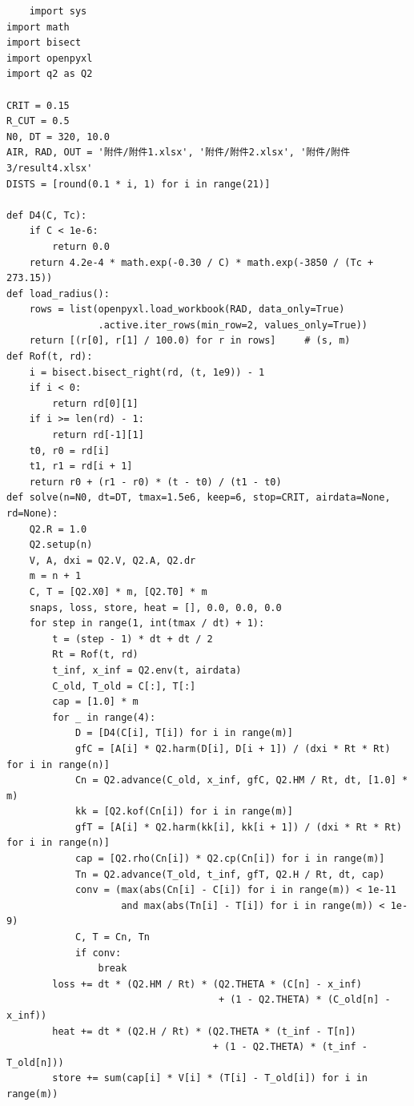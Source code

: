 \documentclass[12pt,a4paper]{article}
\begin{document}
\begin{lstlisting}
	import sys
import math
import bisect
import openpyxl
import q2 as Q2

CRIT = 0.15                          
R_CUT = 0.5                          
N0, DT = 320, 10.0                   
AIR, RAD, OUT = '附件/附件1.xlsx', '附件/附件2.xlsx', '附件/附件3/result4.xlsx'
DISTS = [round(0.1 * i, 1) for i in range(21)]      

def D4(C, Tc):
    if C < 1e-6:
        return 0.0
    return 4.2e-4 * math.exp(-0.30 / C) * math.exp(-3850 / (Tc + 273.15))
def load_radius():
    rows = list(openpyxl.load_workbook(RAD, data_only=True)
                .active.iter_rows(min_row=2, values_only=True))
    return [(r[0], r[1] / 100.0) for r in rows]     # (s, m)
def Rof(t, rd):
    i = bisect.bisect_right(rd, (t, 1e9)) - 1
    if i < 0:
        return rd[0][1]
    if i >= len(rd) - 1:
        return rd[-1][1]
    t0, r0 = rd[i]
    t1, r1 = rd[i + 1]
    return r0 + (r1 - r0) * (t - t0) / (t1 - t0)
def solve(n=N0, dt=DT, tmax=1.5e6, keep=6, stop=CRIT, airdata=None, rd=None):
    Q2.R = 1.0                       
    Q2.setup(n)
    V, A, dxi = Q2.V, Q2.A, Q2.dr
    m = n + 1
    C, T = [Q2.X0] * m, [Q2.T0] * m
    snaps, loss, store, heat = [], 0.0, 0.0, 0.0
    for step in range(1, int(tmax / dt) + 1):
        t = (step - 1) * dt + dt / 2                 
        Rt = Rof(t, rd)
        t_inf, x_inf = Q2.env(t, airdata)
        C_old, T_old = C[:], T[:]
        cap = [1.0] * m
        for _ in range(4):                           
            D = [D4(C[i], T[i]) for i in range(m)]
            gfC = [A[i] * Q2.harm(D[i], D[i + 1]) / (dxi * Rt * Rt) for i in range(n)]
            Cn = Q2.advance(C_old, x_inf, gfC, Q2.HM / Rt, dt, [1.0] * m)
            kk = [Q2.kof(Cn[i]) for i in range(m)]
            gfT = [A[i] * Q2.harm(kk[i], kk[i + 1]) / (dxi * Rt * Rt) for i in range(n)]
            cap = [Q2.rho(Cn[i]) * Q2.cp(Cn[i]) for i in range(m)]
            Tn = Q2.advance(T_old, t_inf, gfT, Q2.H / Rt, dt, cap)
            conv = (max(abs(Cn[i] - C[i]) for i in range(m)) < 1e-11
                    and max(abs(Tn[i] - T[i]) for i in range(m)) < 1e-9)
            C, T = Cn, Tn
            if conv:
                break
        loss += dt * (Q2.HM / Rt) * (Q2.THETA * (C[n] - x_inf)
                                     + (1 - Q2.THETA) * (C_old[n] - x_inf))
        heat += dt * (Q2.H / Rt) * (Q2.THETA * (t_inf - T[n])
                                    + (1 - Q2.THETA) * (t_inf - T_old[n]))
        store += sum(cap[i] * V[i] * (T[i] - T_old[i]) for i in range(m))

\end{lstlisting}
\end{document}
